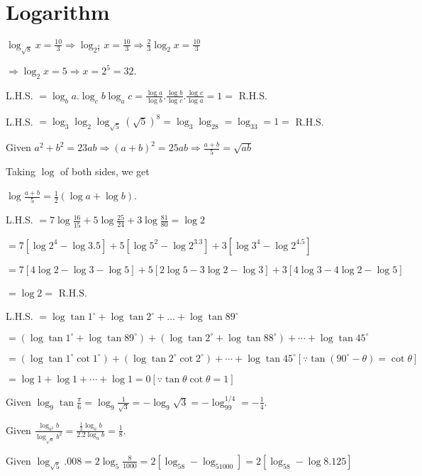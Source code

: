 \chapter{Logarithm}
\startitemize[n, 1*broad]
\item $\log_{\sqrt{8}}x = \frac{10}{3} \Rightarrow \log_{2^{\tfrac{3}{2}}}x = \frac{10}{3}\Rightarrow \frac{2}{3}\log_2x = \frac{10}{3}$

  $\Rightarrow \log_2x = 5 \Rightarrow x = 2^5 = 32.$
\item L.H.S. $= \log_ba.\log_cb\log_ac = \frac{\log a}{\log b}.\frac{\log b}{\log c}.\frac{\log c}{\log a} = 1 =$ R.H.S.
\item L.H.S. $= \log_3\log_2\log_{\sqrt{5}}(\sqrt{5})^8 = \log_3\log_28 = \log_33 = 1 =$ R.H.S.
\item Given $a^2 + b^2 = 23ab \Rightarrow (a + b)^2 = 25ab \Rightarrow \frac{a + b}{5} = \sqrt{ab}$

  Taking $\log$ of both sides, we get

  $\log\frac{a + b}{5} = \frac{1}{2}(\log a + \log b)$.
\item L.H.S. $= 7\log\frac{16}{15} + 5\log\frac{25}{24} + 3\log\frac{81}{80} = \log 2$

  $= 7[\log 2^4 - \log 3.5] + 5[\log 5^2 - \log 2^3.3] + 3[\log 3^4 - \log 2^4.5]$

  $= 7[4\log 2 - \log 3 - \log 5] + 5[2\log 5 - 3\log 2 - \log 3] + 3[4\log 3 - 4\log 2 - \log 5]$

  $= \log 2 =$ R.H.S.
\item L.H.S. $= \log\tan1^\circ + \log\tan2^\circ + \ldots + \log\tan89^\circ$

  $= (\log\tan1^\circ + \log\tan89^\circ) + (\log\tan2^\circ + \log\tan88^\circ) + \cdots + \log\tan45^\circ$

  $=(\log\tan1^\circ\cot1^\circ) + (\log\tan2^\circ\cot2^\circ) + \cdots + \log\tan45^\circ [\because \tan(90^\circ - \theta) =
  \cot\theta]$

  $= \log 1 + \log 1 + \cdots + \log 1 = 0 [\because \tan\theta\cot\theta = 1]$
\item Given $\log_9\tan\frac{\pi}{6} = \log_9\frac{1}{\sqrt{3}} = -\log_9\sqrt{3} = -\log_99^{1/4} = -\frac{1}{4}$.
\item Given $\frac{\log_{a^2}b}{\log_{\sqrt{a}}b^2} = \frac{\frac{1}{2}\log_ab}{2.2\log_ab} = \frac{1}{8}$.
\item Given $\log_{\sqrt{5}}.008 = 2\log_5\frac{8}{1000} = 2[\log_58 - \log_51000] = 2[\log_58 - \log 8.125]$

